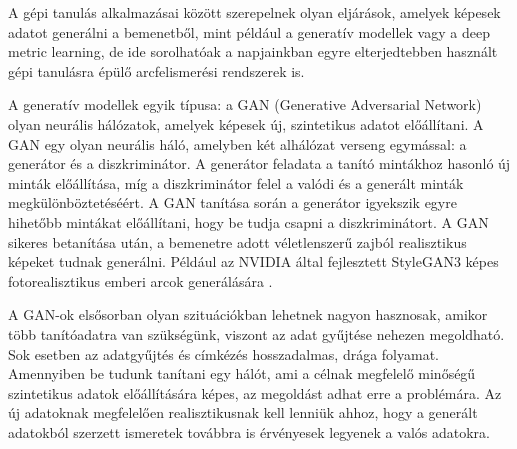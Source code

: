 % 


A gépi tanulás alkalmazásai között szerepelnek olyan eljárások, amelyek képesek adatot generálni a bemenetből, mint például a generatív modellek vagy a deep metric learning, de ide sorolhatóak a napjainkban egyre elterjedtebben használt gépi tanulásra épülő arcfelismerési rendszerek is.


A generatív modellek egyik típusa: a GAN (Generative Adversarial Network) olyan neurális hálózatok, amelyek képesek új, szintetikus adatot előállítani. A GAN egy olyan neurális háló, amelyben két alhálózat verseng egymással: a generátor és a diszkriminátor. A generátor feladata a tanító mintákhoz hasonló új minták előállítása, míg a diszkriminátor felel a valódi és a generált minták megkülönböztetéséért. A GAN tanítása során a generátor igyekszik egyre hihetőbb mintákat előállítani, hogy be tudja csapni a diszkriminátort. A GAN sikeres betanítása után, a bemenetre adott véletlenszerű zajból realisztikus képeket tudnak generálni. Például az NVIDIA által fejlesztett StyleGAN3 képes fotorealisztikus emberi arcok generálására \cite{stylegan3}.

A GAN-ok elsősorban olyan szituációkban lehetnek nagyon hasznosak, amikor több tanítóadatra van szükségünk, viszont az adat gyűjtése nehezen megoldható. Sok esetben az adatgyűjtés és címkézés hosszadalmas, drága folyamat. Amennyiben be tudunk tanítani egy hálót, ami a célnak megfelelő minőségű szintetikus adatok előállítására képes, az megoldást adhat erre a problémára. Az új adatoknak megfelelően realisztikusnak kell lenniük ahhoz, hogy a generált adatokból szerzett ismeretek továbbra is érvényesek legyenek a valós adatokra. 



